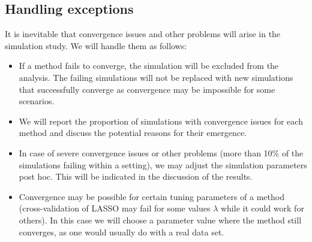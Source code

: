 \subsection{Handling exceptions} \label{sec:exceptions}
It is inevitable that convergence issues and other problems will arise
in the simulation study. We will handle them as follows:
\begin{itemize}
  \item If a method fails to converge, the simulation will be excluded from the
  analysis. The failing simulations will not be replaced with new simulations that
  successfully converge as convergence may be impossible for some scenarios.
  \item We will report the proportion of simulations with convergence issues
  for each method and discuss the potential reasons for their emergence.
  \item In case of severe convergence issues or other problems (more than 10\% of the
  simulations failing within a setting), we may adjust
  the simulation parameters post hoc. This will be indicated in the discussion of
  the results.
  \item Convergence may be possible for certain tuning parameters of a method
  (\eg cross-validation of LASSO may fail for some values $\lambda$ while it could
  work for others). In this case we will choose a parameter value where the method
  still converges, as one would usually do with a real data set.

\end{itemize}




